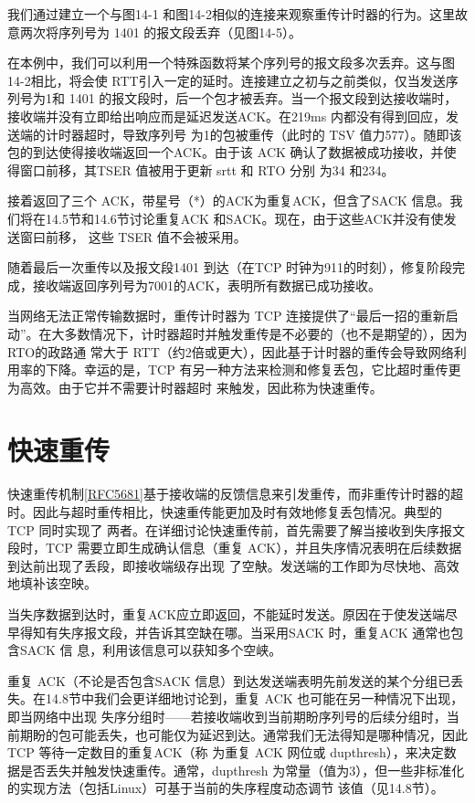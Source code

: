我们通过建立一个与图14-1 和图14-2相似的连接来观察重传计时器的行为。这里故意两次将序列号为 1401 的报文段丢弃（见图14-5）。

在本例中，我们可以利用一个特殊函数将某个序列号的报文段多次丢弃。这与图14-2相比，将会使 RTT引入一定的延时。连接建立之初与之前类似，仅当发送序列号为1和
1401 的报文段时，后一个包才被丢弃。当一个报文段到达接收端时，接收端并没有立即给出响应而是延迟发送ACK。在219ms 内都没有得到回应，发送端的计时器超时，导致序列号
为1的包被重传（此时的 TSV 值力577）。随即该包的到达使得接收端返回一个ACK。由于该 ACK 确认了数据被成功接收，并使得窗口前移，其TSER 值被用于更新 srtt 和 RTO 分别
为34 和234。

接着返回了三个 ACK，带星号（*）的ACK为重复ACK，但含了SACK 信息。我们将在14.5节和14.6节讨论重复ACK 和SACK。现在，由于这些ACK并没有使发送窗曰前移，
这些 TSER 值不会被采用。

随着最后一次重传以及报文段1401 到达（在TCP 时钟为911的时刻），修复阶段完成，接收端返回序列号为7001的ACK，表明所有数据已成功接收。

当网络无法正常传输数据时，重传计时器为 TCP 连接提供了“最后一招的重新启动”。在大多数情况下，计时器超时并触发重传是不必要的（也不是期望的），因为RTO的政路通
常大于 RTT（约2倍或更大），因此基于计时器的重传会导致网络利用率的下降。幸运的是，TCP 有另一种方法来检测和修复丢包，它比超时重传更为高效。由于它并不需要计时器超时
来触发，因此称为快速重传。

\section{快速重传}
快速重传机制\href{https://www.rfc-editor.org/rfc/rfc5681}{[RFC5681]}基于接收端的反馈信息来引发重传，而非重传计时器的超时。因此与超时重传相比，快速重传能更加及时有效地修复丢包情况。典型的TCP 同时实现了
两者。在详细讨论快速重传前，首先需要了解当接收到失序报文段时，TCP 需要立即生成确认信息（重复 ACK），并且失序情况表明在后续数据到达前出现了丢段，即接收端级存出现
了空觖。发送端的工作即为尽快地、高效地填补该空映。

当失序数据到达时，重复ACK应立即返回，不能延时发送。原因在于使发送端尽早得知有失序报文段，并告诉其空缺在哪。当采用SACK 时，重复ACK 通常也包含SACK 信
息，利用该信息可以获知多个空峡。

重复 ACK（不论是否包含SACK 信息）到达发送端表明先前发送的某个分组已丢失。在14.8节中我们会更详细地讨论到，重复 ACK 也可能在另一种情况下出现，即当网络中出现
失序分组时——若接收端收到当前期盼序列号的后续分组时，当前期盼的包可能丢失，也可能仅为延迟到达。通常我们无法得知是哪种情况，因此TCP 等待一定数目的重复ACK（称
为重复 ACK 网位或 dupthresh），来决定数据是否丢失并触发快速重传。通常，dupthresh 为常量（值为3），但一些非标准化的实现方法（包括Linux）可基于当前的失序程度动态调节
该值（见14.8节）。

